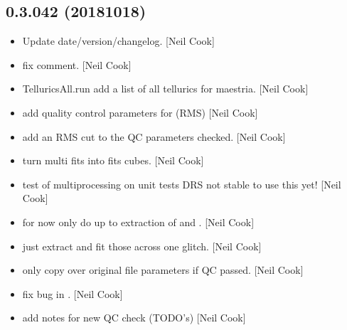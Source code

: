 \documentclass[a4paper,10pt,english]{report}
\begin{document}
\subsection{0.3.042 (2018\sphinxhyphen{}10\sphinxhyphen{}18)}
\label{\detokenize{misc/changelog:id307}}\begin{itemize}
\item {} 
Update date/version/changelog. {[}Neil Cook{]}

\item {} 
 \sphinxhyphen{} fix comment. {[}Neil Cook{]}

\item {} 
TelluricsAll.run \sphinxhyphen{} add a list of all tellurics for maestria. {[}Neil
Cook{]}

\item {} 
 \sphinxhyphen{} add quality control parameters for 
(RMS) {[}Neil Cook{]}

\item {} 
 \sphinxhyphen{} add an RMS cut to the QC parameters checked. {[}Neil
Cook{]}

\item {} 
 \sphinxhyphen{} turn multi fits into fits cubes. {[}Neil Cook{]}

\item {} 
 \sphinxhyphen{} test of multiprocessing on unit tests \sphinxhyphen{} DRS
not stable to use this yet! {[}Neil Cook{]}

\item {} 
 \sphinxhyphen{} for now only do up to extraction of  and
. {[}Neil Cook{]}

\item {} 
 \sphinxhyphen{} just extract and fit those across one glitch. {[}Neil
Cook{]}

\item {} 
 only copy over original file parameters if QC passed.
{[}Neil Cook{]}

\item {} 
 \sphinxhyphen{} fix bug in . {[}Neil Cook{]}

\item {} 
 \sphinxhyphen{} add notes for new QC check (TODO’s) {[}Neil Cook{]}


\end{itemize}
\end{document}
